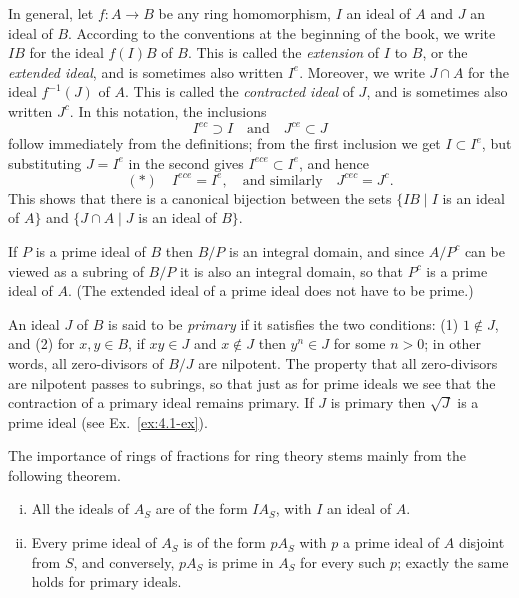 In general, let $f\colon A \to B$ be any ring homomorphism, $I$ an ideal of $A$
and $J$ an ideal of $B$. According to the conventions at the beginning of the
book, we write $IB$ for the ideal $f(I)B$ of $B$. This is called the \emph{extension} of
$I$ to $B$, or the \emph{extended ideal}, and is sometimes also written $I^e$. Moreover,
we write $J \cap A$ for the ideal $f^{-1}(J)$ of $A$. This is called the \emph{contracted ideal}
of $J$, and is sometimes also written $J^c$. In this notation, the inclusions
\[
  I^{ec} \supset I \quad \text{and} \quad J^{ce} \subset J
\]
follow immediately from the definitions; from the first inclusion we get
$I \subset I^e$, but substituting $J = I^e$ in the second gives $I^{ece} \subset I^e$, and hence
\[
  (*) \quad I^{ece} = I^e, \quad \text{and similarly} \quad J^{cec} = J^c.
\]
This shows that there is a canonical bijection between the sets $\{IB \mid I$
is an ideal of $A\}$ and $\{J \cap A \mid J$ is an ideal of $B\}$.

If $P$ is a prime ideal of $B$ then $B/P$ is an integral domain, and since
$A/P^c$ can be viewed as a subring of $B/P$ it is also an integral domain, so
that $P^c$ is a prime ideal of $A$. (The extended ideal of a prime ideal does
not have to be prime.)

An ideal $J$ of $B$ is said to be \emph{primary} if it satisfies the two conditions:
(1) $1 \notin J$, and (2) for $x, y \in B$, if $xy \in J$ and $x \notin J$ then $y^n \in J$ for some
$n > 0$; in other words, all zero-divisors of $B/J$ are nilpotent. The property
that all zero-divisors are nilpotent passes to subrings, so that just as for
prime ideals we see that the contraction of a primary ideal remains primary.
If $J$ is primary then $\sqrt{J}$ is a prime ideal (see Ex.~\ref{ex:4.1-ex}).

The importance of rings of fractions for ring theory stems mainly from
the following theorem.

\begin{theorem}\label{thm:4.1}
\begin{enumerate}[(i)]
  \item All the ideals of $A_S$ are of the form $IA_S$, with $I$ an ideal of $A$.
  \item Every prime ideal of $A_S$ is of the form $pA_S$ with $p$ a prime ideal of
        $A$ disjoint from $S$, and conversely, $pA_S$ is prime in $A_S$ for every such $p$;
        exactly the same holds for primary ideals.
\end{enumerate}
\end{theorem}

